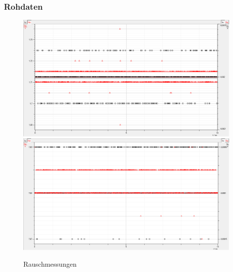 \documentclass[12pt,a4paper]{article}
\begin{document}
\subsubsection{Rohdaten}
\begin{figure}
\includegraphics[scale=0.6]{Rauschmessung1.png}
\includegraphics[scale=0.575]{Rauschmessung2.png}  
\caption{Rauschmessungen}
\end{figure}
\newpage
\end{document}
